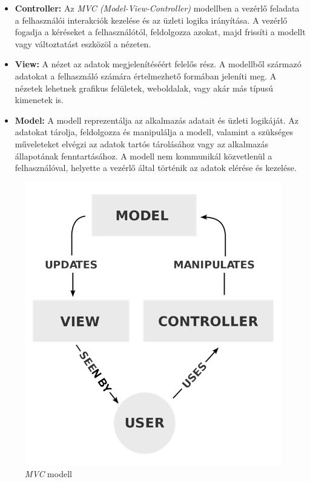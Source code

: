 \begin{itemize}
\item \textbf{Controller:} Az \textit{MVC (Model-View-Controller)} modellben a vezérlő feladata a felhasználói interakciók kezelése és az üzleti logika irányítása. A vezérlő fogadja a kéréseket a felhasználótól, feldolgozza azokat, majd frissíti a modellt vagy változtatást eszközöl a nézeten.
\item \textbf{View:} A nézet az adatok megjelenítéséért felelős rész. A modellből származó adatokat a felhasználó számára értelmezhető formában jeleníti meg. A nézetek lehetnek grafikus felületek, weboldalak, vagy akár más típusú kimenetek is.
\item \textbf{Model:} A modell reprezentálja az alkalmazás adatait és üzleti logikáját. Az adatokat tárolja, feldolgozza és manipulálja a modell, valamint a szükséges műveleteket elvégzi az adatok tartós tárolásához vagy az alkalmazás állapotának fenntartásához. A modell nem kommunikál közvetlenül a felhasználóval, helyette a vezérlő által történik az adatok elérése és kezelése.
\end{itemize}

\begin{figure}[h]
\centering
\includegraphics[scale=0.50]{images/MVC_modified.png}
\caption{\textit{MVC} modell \cite{mvc}}
\label{fig:mvc}
\end{figure}

